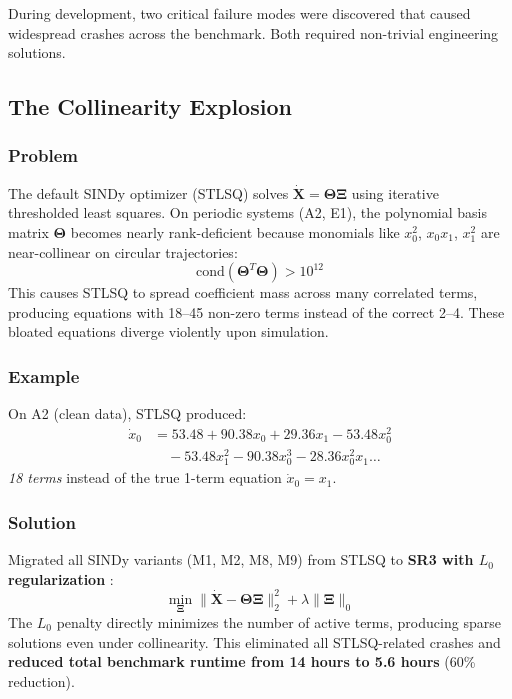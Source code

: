 \documentclass[conference]{IEEEtran}
\begin{document}
During development, two critical failure modes were discovered that caused widespread crashes across the benchmark. Both required non-trivial engineering solutions.

\subsection{The Collinearity Explosion}
\label{sec:collinearity}

\subsubsection{Problem}
The default SINDy optimizer (STLSQ) solves $\dot{\mathbf{X}} = \boldsymbol{\Theta}\boldsymbol{\Xi}$ using iterative thresholded least squares. On periodic systems (A2, E1), the polynomial basis matrix $\boldsymbol{\Theta}$ becomes nearly rank-deficient because monomials like $x_0^2$, $x_0 x_1$, $x_1^2$ are near-collinear on circular trajectories:
\begin{equation}
\text{cond}(\boldsymbol{\Theta}^T\boldsymbol{\Theta}) > 10^{12}
\end{equation}
This causes STLSQ to spread coefficient mass across many correlated terms, producing equations with 18--45 non-zero terms instead of the correct 2--4. These bloated equations diverge violently upon simulation.

\subsubsection{Example}
On A2 (clean data), STLSQ produced:
\begin{align*}
\dot{x}_0 &= 53.48 + 90.38 x_0 + 29.36 x_1 - 53.48 x_0^2 \\
&\quad - 53.48 x_1^2 - 90.38 x_0^3 - 28.36 x_0^2 x_1 \ldots
\end{align*}
\textit{18 terms} instead of the true 1-term equation $\dot{x}_0 = x_1$.

\subsubsection{Solution}
Migrated all SINDy variants (M1, M2, M8, M9) from STLSQ to \textbf{SR3 with $L_0$ regularization} \cite{zheng2019}:
\begin{equation}
\min_{\boldsymbol{\Xi}} \|\dot{\mathbf{X}} - \boldsymbol{\Theta}\boldsymbol{\Xi}\|_2^2 + \lambda \|\boldsymbol{\Xi}\|_0
\end{equation}
The $L_0$ penalty directly minimizes the number of active terms, producing sparse solutions even under collinearity. This eliminated all STLSQ-related crashes and \textbf{reduced total benchmark runtime from 14 hours to 5.6 hours} (60\% reduction).
\end{document}
